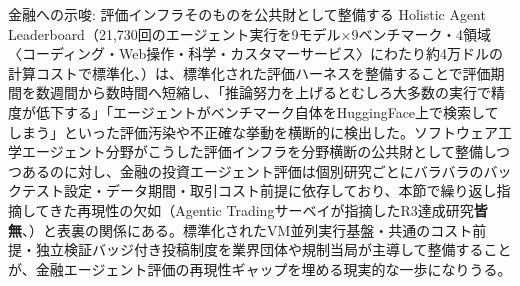\begin{insight}{金融への示唆: 評価インフラそのものを公共財として整備する}
Holistic Agent Leaderboard（21,730回のエージェント実行を9モデル×9ベンチマーク・4領域〈コーディング・Web操作・科学・カスタマーサービス〉にわたり約4万ドルの計算コストで標準化、\cite{y04holisticagentleaderboard2025}）は、標準化された評価ハーネスを整備することで評価期間を数週間から数時間へ短縮し、「推論努力を上げるとむしろ大多数の実行で精度が低下する」「エージェントがベンチマーク自体をHuggingFace上で検索してしまう」といった評価汚染や不正確な挙動を横断的に検出した。ソフトウェア工学エージェント分野がこうした評価インフラを分野横断の公共財として整備しつつあるのに対し、金融の投資エージェント評価は個別研究ごとにバラバラのバックテスト設定・データ期間・取引コスト前提に依存しており、本節で繰り返し指摘してきた再現性の欠如（Agentic Tradingサーベイが指摘したR3達成研究\textbf{皆無}、\cite{agentictrading2026}）と表裏の関係にある。標準化されたVM並列実行基盤・共通のコスト前提・独立検証バッジ付き投稿制度を業界団体や規制当局が主導して整備することが、金融エージェント評価の再現性ギャップを埋める現実的な一歩になりうる。
\end{insight}
